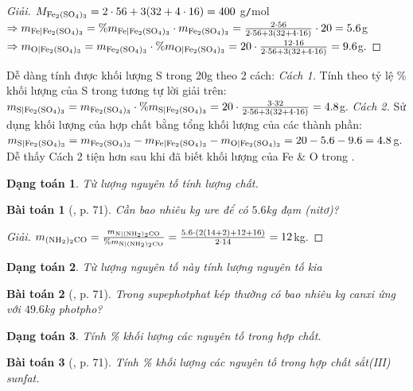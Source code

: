 \documentclass{article}
\newtheorem{baitoan}{Bài toán}
\newtheorem{dangtoan}{Dạng toán}
\begin{document}
\begin{proof}[Giải]
	$M_{\ce{Fe2(SO4)3}} = 2\cdot56 + 3(32 + 4\cdot16) = 400$ g\texttt{/}mol$\Rightarrow m_{\ce{Fe|Fe2(SO4)3}} = \%m_{\ce{Fe|Fe2(SO4)3}}\cdot m_{\ce{Fe2(SO4)3}} = \frac{2\cdot56}{2\cdot56 + 3(32 + 4\cdot16)}\cdot20 = 5.6$g$\Rightarrow m_{\ce{O|Fe2(SO4)3}} = m_{\ce{Fe2(SO4)3}}\cdot\%m_{\ce{O|Fe2(SO4)3}} = 20\cdot\frac{12\cdot16}{2\cdot56 + 3(32 + 4\cdot16)} = 9.6$g.
\end{proof}
Dễ dàng tính được khối lượng S trong 20g  theo 2 cách: \textit{Cách 1.} Tính theo tỷ lệ \% khối lượng của S trong  tương tự lời giải trên: $m_{\ce{S|Fe2(SO4)3}} = m_{\ce{Fe2(SO4)3}}\cdot\%m_{\ce{S|Fe2(SO4)3}} = 20\cdot\frac{3\cdot32}{2\cdot56 + 3(32 + 4\cdot16)} = 4.8$g. \textit{Cách 2.} Sử dụng khối lượng của hợp chất bằng tổng khối lượng của các thành phần: $m_{\ce{S|Fe2(SO4)3}} = m_{\ce{Fe2(SO4)3}} - m_{\ce{Fe|Fe2(SO4)3}} - m_{\ce{O|Fe2(SO4)3}} = 20 - 5.6 - 9.6 = 4.8$g. Dễ thấy Cách 2 tiện hơn sau khi đã biết khối lượng của Fe \& O trong .

\begin{dangtoan}
	Từ lượng nguyên tố tính lượng chất.
\end{dangtoan}

\begin{baitoan}[\cite{Tuan2022}, p. 71]
	Cần bao nhiêu \emph{kg} ure \emph{} để có $5.6$\emph{kg} đạm (nitơ)?
\end{baitoan}

\begin{proof}[Giải]
	$m_{\ce{(NH2)2CO}} = \frac{m_{\ce{N|(NH2)2CO}}}{\%m_{\ce{N|(NH2)2CO}}} = \frac{5.6\cdot(2(14 + 2) + 12 + 16)}{2\cdot14} = 12$kg.
\end{proof}

\begin{dangtoan}
	Từ lượng nguyên tố này tính lượng nguyên tố kia
\end{dangtoan}

\begin{baitoan}[\cite{Tuan2022}, p. 71]
	Trong supephotphat kép thường có bao nhiêu kg canxi ứng với $49.6$\emph{kg} photpho?
\end{baitoan}

\begin{dangtoan}
	Tính \% khối lượng các nguyên tố trong hợp chất.
\end{dangtoan}

\begin{baitoan}[\cite{Tuan2022}, p. 71]
	Tính \% khối lượng các nguyên tố trong hợp chất sắt(III) sunfat.
\end{baitoan}
\end{document}
